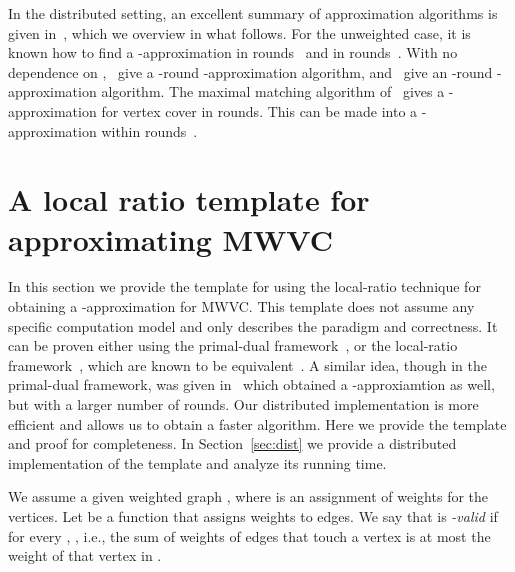 \documentclass[11pt]{article}
\begin{document}
In the distributed setting, an excellent summary of approximation algorithms is given in~\cite{AstrandS10}, which we overview in what follows. For the unweighted case, it is known how to find a -approximation in  rounds~\cite{HanckowiakKP01} and in  rounds~\cite{PanconesiR01}. With no dependence on ,~\cite{AstrandFPRSU09} give a -round -approximation algorithm, and~\cite{PolishchukS09} give an -round -approximation algorithm. The maximal matching algorithm of~\cite{BarenboimEPS12} gives a -approximation for vertex cover in  rounds. This can be made into a -approximation within  rounds~\cite{PettiePersonal}.

\section{A local ratio template for approximating MWVC}
\label{sec:LR}
In this section we provide the template for using the local-ratio technique for obtaining a -approximation for MWVC. This template does not assume any specific computation model and only describes the paradigm and correctness. It can be proven either using the primal-dual framework~\cite{BarYehudaE81}, or the local-ratio framework~\cite{BarYehuda00}, which are known to be equivalent~\cite{BarYehudaR05}. A similar idea, though in the primal-dual framework, was given in~\cite{KhullerVY94} which obtained a -approxiamtion as well, but with a larger number of rounds. Our distributed implementation is more efficient and allows us to obtain a faster algorithm.
Here we provide the template and proof for completeness. In Section~\ref{sec:dist} we provide a distributed implementation of the template and analyze its running time.

We assume a given weighted graph , where  is an assignment of weights for the vertices.
Let  be a function that assigns weights to edges. We say that  is \emph{-valid} if for every , , i.e., the sum of weights of edges that touch a vertex is at most the weight of that vertex in .
\end{document}
